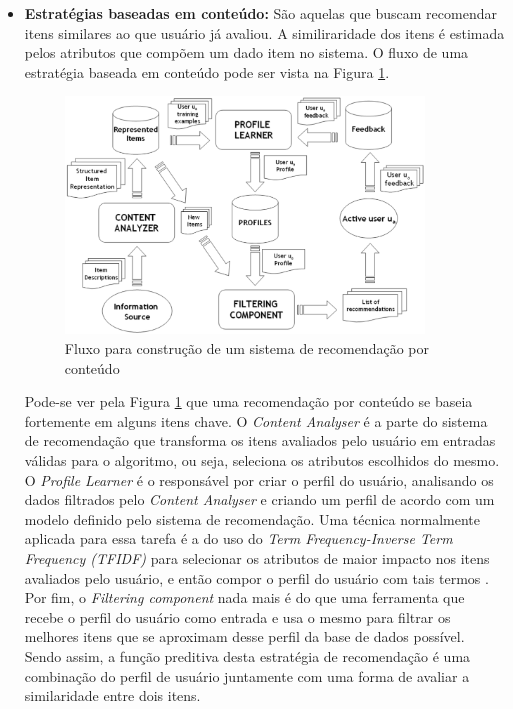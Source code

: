 \begin{itemize}
    \item \textbf{Estratégias baseadas em conteúdo: } São aquelas que buscam
        recomendar itens similares ao que usuário já avaliou. A similiraridade
        dos itens é estimada pelos atributos que compõem um dado item no
        sistema. O fluxo de uma estratégia baseada em conteúdo pode ser vista na
        Figura \ref{fig:recomendacao_conteudo}.

        \begin{figure}[h]
            \centering
            \includegraphics[width=0.9\textwidth]{figuras/recomendacao_conteudo}
            \caption{Fluxo para construção de um sistema de recomendação por
            conteúdo \cite{lops2011content}}
            \label{fig:recomendacao_conteudo}
        \end{figure}

        Pode-se ver pela Figura \ref{fig:recomendacao_conteudo} que uma recomendação
        por conteúdo se baseia fortemente em alguns itens chave. O
        \textit{Content Analyser} é a parte do sistema de recomendação que
        transforma os itens avaliados pelo usuário em entradas válidas para o
        algoritmo, ou seja, seleciona os atributos escolhidos do mesmo. O
        \textit{Profile Learner} é o responsável por criar o perfil do
        usuário, analisando os dados filtrados pelo \textit{Content Analyser} e
        criando um perfil de acordo com um modelo definido pelo
        sistema de recomendação. Uma técnica normalmente aplicada para essa tarefa
        é a do uso do \textit{Term Frequency-Inverse Term Frequency (TFIDF)}
        para selecionar os atributos de maior impacto nos itens avaliados pelo
        usuário, e então compor o perfil do usuário com tais termos
        \cite{lops2011content}. Por fim, o \textit{Filtering component} nada mais é do que uma
        ferramenta que recebe o perfil do usuário como entrada e usa o mesmo
        para filtrar os melhores itens que se aproximam desse perfil da base de
        dados possível. Sendo assim, a função preditiva desta estratégia de
        recomendação é uma combinação do perfil de usuário juntamente com uma
        forma de avaliar a similaridade entre dois itens.


\end{itemize}
